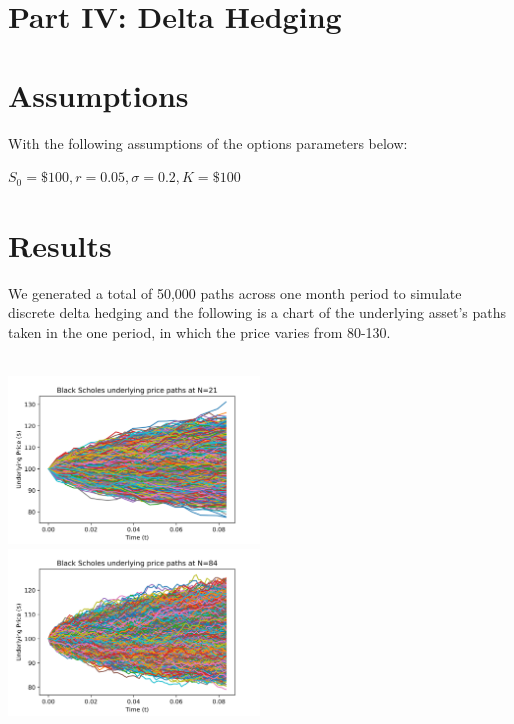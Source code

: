 \documentclass{article}
\begin{document}
\section*{Part IV: Delta Hedging}	
\setcounter{section}{0}
\section{Assumptions}
With the following assumptions of the options parameters below:\\ 

\begin{center}
	$S_0 = \$100 ,r = 0.05, \sigma = 0.2, K = \$100$ 
\end{center} 

\section{Results}

\noindent We generated a total of 50,000 paths across one month period to simulate discrete delta hedging and the following is a chart of the underlying asset's paths taken in the one period, in which the price varies from 80-130.\\ \\

\begin{center}
	\includegraphics[width=0.5\textwidth]{./images/BS_price_21.jpg}%
	\includegraphics[width=0.5\textwidth]{./images/BS_price_84.jpg}
\end{center}
\end{document}
